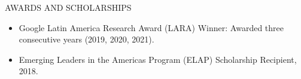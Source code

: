\documentclass{resume} %
\begin{document}
\vspace{-0.2cm}
\begin{rSection}{AWARDS AND SCHOLARSHIPS} 
\begin{itemize}
    \item Google Latin America Research Award (LARA) Winner: Awarded three consecutive years (2019, 2020, 2021).
    \vspace{-0.25cm}
    \item Emerging Leaders in the Americas Program (ELAP) Scholarship Recipient, 2018.
\end{itemize}
\end{rSection}




\end{document}
